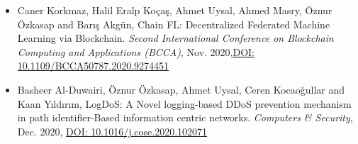 
\vspace*{-1.5mm}


  \begin{justify}
  \begin{itemize}[leftmargin=2ex, nosep, noitemsep]
    \setlength{\parskip}{0pt}
    \renewcommand{\labelitemi}{\bullet}
    \paragraphstyle
    \item Caner Korkmaz, Halil Eralp Koçaş, Ahmet Uysal, Ahmed Masry, Öznur Özkasap and Barış Akgün,  Chain FL: Decentralized Federated Machine Learning via Blockchain. \textit{Second International Conference on Blockchain Computing and Applications (BCCA)}, Nov. 2020,\newline \href{https://doi.org/10.1109/BCCA50787.2020.9274451}{DOI: 10.1109/BCCA50787.2020.9274451}
    \item Basheer Al-Duwairi, Öznur Özkasap, Ahmet Uysal, Ceren Kocaoğullar and Kaan Yıldırım, LogDoS: A Novel logging-based DDoS prevention mechanism in path identifier-Based information centric networks. \textit{Computers \& Security}, Dec. 2020, \href{https://doi.org/10.1016/j.cose.2020.102071}{DOI: 10.1016/j.cose.2020.102071}
  \end{itemize}
  \end{justify}


